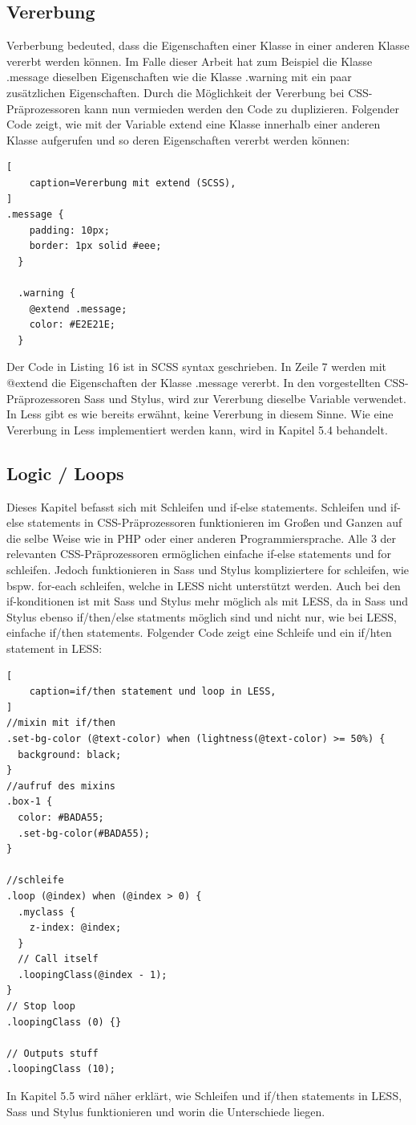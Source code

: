 \subsection{Vererbung}
Verberbung bedeuted, dass die Eigenschaften einer Klasse in einer anderen Klasse vererbt werden können. Im Falle dieser Arbeit hat zum Beispiel die Klasse .message dieselben Eigenschaften wie die Klasse .warning mit ein paar zusätzlichen Eigenschaften. Durch die Möglichkeit der Vererbung bei CSS-Präprozessoren kann nun vermieden werden den Code zu duplizieren. Folgender Code zeigt, wie mit der Variable extend eine Klasse innerhalb einer anderen Klasse aufgerufen und so deren Eigenschaften vererbt werden können:
\begin{lstlisting}[
	caption=Vererbung mit extend (SCSS),
]
.message {
    padding: 10px;
    border: 1px solid #eee;
  }

  .warning {
    @extend .message;
    color: #E2E21E;
  }
\end{lstlisting}
Der Code in Listing 16 ist in SCSS syntax geschrieben. In Zeile 7 werden mit @extend die Eigenschaften der Klasse .message vererbt. In den vorgestellten CSS-Präprozessoren Sass und Stylus, wird zur Vererbung dieselbe Variable verwendet. In Less gibt es wie bereits erwähnt, keine Vererbung in diesem Sinne. Wie eine Vererbung in Less implementiert werden kann, wird in Kapitel 5.4 behandelt.
\subsection{Logic / Loops}
Dieses Kapitel befasst sich mit Schleifen und if-else statements. \newline
Schleifen und if-else statements in CSS-Präprozessoren funktionieren im Großen und Ganzen auf die selbe Weise wie in PHP oder einer anderen Programmiersprache. Alle 3 der relevanten CSS-Präprozessoren ermöglichen einfache if-else statements und for schleifen.\newline
Jedoch funktionieren in Sass und Stylus kompliziertere for schleifen, wie bspw. for-each schleifen, welche in LESS nicht unterstützt werden. Auch bei den if-konditionen ist mit Sass und Stylus mehr möglich als mit LESS, da in Sass und Stylus ebenso if/then/else statments möglich sind und nicht nur, wie bei LESS, einfache if/then statements.\newline
Folgender Code zeigt eine Schleife und ein if/hten statement in LESS:\autocite[]{Coyier.2012}
\begin{lstlisting}[
	caption=if/then statement und loop in LESS,
]
//mixin mit if/then
.set-bg-color (@text-color) when (lightness(@text-color) >= 50%) { 
  background: black;
}
//aufruf des mixins
.box-1 {
  color: #BADA55;
  .set-bg-color(#BADA55);
}

//schleife
.loop (@index) when (@index > 0) {
  .myclass {
    z-index: @index;
  }
  // Call itself
  .loopingClass(@index - 1);
}
// Stop loop
.loopingClass (0) {}

// Outputs stuff
.loopingClass (10);
\end{lstlisting}
\newpage
In Kapitel 5.5 wird näher erklärt, wie Schleifen und if/then statements in LESS, Sass und Stylus funktionieren und worin die Unterschiede liegen.

